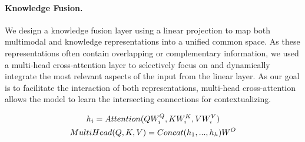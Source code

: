 {%


\vspace{-2mm}
\paragraph{Knowledge Fusion.}
\label{knowledge-fusion-layer}

We design a knowledge fusion layer using a linear projection to map both multimodal and knowledge representations into a unified common space. As these representations often contain overlapping or complementary information, we used a multi-head cross-attention layer to selectively focus on and dynamically integrate the most relevant aspects of the input from the linear layer. As our goal is to facilitate the interaction of both representations, multi-head cross-attention allows the model to learn the intersecting connections for contextualizing. 

\vspace{-1.2em}
\begin{equation}
\begin{gathered}
    h_i = Attention(Q W^Q_i, K W^K_i, V W^V_i) \\ 
    MultiHead(Q, K, V) = Concat(h_1, ..., h_h)W^O 
\end{gathered} 
\vspace{-0.5em}
\label{eqn-attn}
\end{equation}

}
